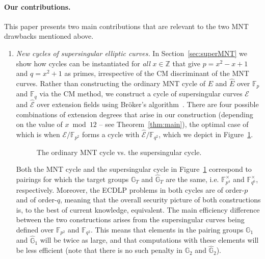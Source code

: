 \documentclass[version=preprint]{iacrcc}
\newcommand{\Z}{\mathbb{Z}}
\newcommand{\F}{\mathbb{F}}
\newcommand{\EC}{\mathcal{E}}
\begin{document}
\paragraph{Our contributions.} This paper presents two main contributions that are relevant to the two MNT drawbacks mentioned above. 
\begin{enumerate}
\item \emph{New cycles of supersingular elliptic curves.} In Section~\ref{sec:superMNT} we show how cycles can be instantiated for \emph{all} $x \in \Z$ that give $p=x^2-x+1$ and $q=x^2+1$ as primes, irrespective of the CM discriminant of the MNT curves. Rather than constructing the ordinary MNT cycle of $E$ and $\hat{E}$ over $\F_{p}$ and $\F_q$ via the CM method, we construct a cycle of supersingular curves $\EC$ and $\hat{\EC}$ over extension fields using Br{\"o}ker's algorithm~\cite{broker}. There are four possible combinations of extension degrees that arise in our construction (depending on the value of $x \bmod{12}$ -- see Theorem~\ref{thm:main}), the optimal case of which is when $\EC/\F_{p^2}$ forms a cycle with  $\hat{\EC}/\F_{q^2}$, which we depict in Figure~\ref{fig:10mod12}. 

\begin{figure}[!ht]
		\centering
	\caption{The ordinary MNT cycle vs. the supersingular cycle.}
	\label{fig:10mod12}

\end{figure}

Both the MNT cycle and the supersingular cycle in Figure~\ref{fig:10mod12} correspond to pairings for which the target groups $\mathbb{G}_T$ and $\hat{\mathbb{G}}_T$ are the same, i.e. $\F_{p^4}^\times$ and $\F_{q^6}^\times$, respectively. Moreover, the ECDLP problems in both cycles are of order-$p$ and of order-$q$, meaning that the overall security picture of both constructions is, to the best of current knowledge, equivalent. The main efficiency difference between the two constructions arises from the supersingular curves being defined over $\F_{p^2}$ and $\F_{q^2}$. This means that elements in the pairing groups $\mathbb{G}_1$ and $\hat{\mathbb{G}}_1$ will be twice as large, and that computations with these elements will be less efficient (note that there is no such penalty in $\mathbb{G}_2$ and $\hat{\mathbb{G}}_2$). 


\end{enumerate}
\end{document}
